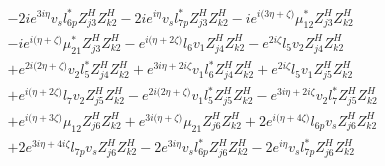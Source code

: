 \begin{align}
 &-2 i e^{3 i \eta } v_s l_{6p}^* Z_{{j 3}}^{H} Z_{{k 2}}^{H} -2 i e^{i \eta } v_s l_{7p}^* Z_{{j 3}}^{H} Z_{{k 2}}^{H} -i e^{i \Big(3 \eta +\zeta \Big)} \mu_{12}^* Z_{{j 3}}^{H} Z_{{k 2}}^{H} \nonumber \\ 
 &-i e^{i \Big(\eta +\zeta \Big)} \mu_{21}^* Z_{{j 3}}^{H} Z_{{k 2}}^{H} - e^{i \Big(\eta +2 \zeta \Big)} l_6 v_1 Z_{{j 4}}^{H} Z_{{k 2}}^{H} - e^{2 i \zeta } l_5 v_2 Z_{{j 4}}^{H} Z_{{k 2}}^{H} \nonumber \\ 
 &+e^{2 i \Big(2 \eta +\zeta \Big)} v_2 l_5^* Z_{{j 4}}^{H} Z_{{k 2}}^{H} +e^{3 i \eta +2 i \zeta } v_1 l_6^* Z_{{j 4}}^{H} Z_{{k 2}}^{H} +e^{2 i \zeta } l_5 v_1 Z_{{j 5}}^{H} Z_{{k 2}}^{H} \nonumber \\ 
 &+e^{i \Big(\eta +2 \zeta \Big)} l_7 v_2 Z_{{j 5}}^{H} Z_{{k 2}}^{H} - e^{2 i \Big(2 \eta +\zeta \Big)} v_1 l_5^* Z_{{j 5}}^{H} Z_{{k 2}}^{H} - e^{3 i \eta +2 i \zeta } v_2 l_7^* Z_{{j 5}}^{H} Z_{{k 2}}^{H} \nonumber \\ 
 &+e^{i \Big(\eta +3 \zeta \Big)} \mu_{12} Z_{{j 6}}^{H} Z_{{k 2}}^{H} +e^{3 i \Big(\eta +\zeta \Big)} \mu_{21} Z_{{j 6}}^{H} Z_{{k 2}}^{H} +2 e^{i \Big(\eta +4 \zeta \Big)} l_{6p} v_s Z_{{j 6}}^{H} Z_{{k 2}}^{H} \nonumber \\ 
 &+2 e^{3 i \eta +4 i \zeta } l_{7p} v_s Z_{{j 6}}^{H} Z_{{k 2}}^{H} -2 e^{3 i \eta } v_s l_{6p}^* Z_{{j 6}}^{H} Z_{{k 2}}^{H} -2 e^{i \eta } v_s l_{7p}^* Z_{{j 6}}^{H} Z_{{k 2}}^{H} \nonumber 
\end{align} 
